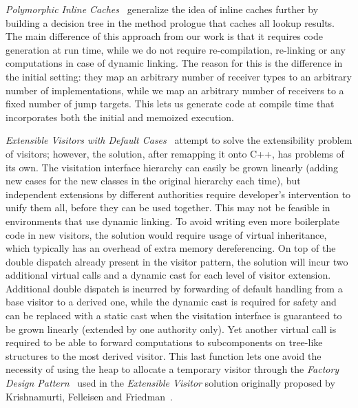 \emph{Polymorphic Inline Caches}~\cite{Holzle:Chambers:Ungar:91} generalize the 
idea of inline caches further by building a decision tree in the method prologue 
that caches all lookup results. The main difference of this approach from our 
work is that it requires code generation at run time, while we do not require
re-compilation, re-linking or any computations in case of dynamic linking.
The reason for this is the difference in the initial setting: they map an
arbitrary number of receiver types to an arbitrary number of implementations, while 
we map an arbitrary number of receivers to a fixed number of jump 
targets. This lets us generate code at compile time that incorporates both the 
initial and memoized execution.

\emph{Extensible Visitors with Default Cases}~\cite[]{Zenger:2001} attempt to solve the extensibility problem of visitors; 
however, the solution, after 
remapping it onto C++, has problems of its own. The visitation interface 
hierarchy can easily be grown linearly (adding new cases for the new classes in 
the original hierarchy each time), but independent extensions by different  
authorities require developer's intervention to unify them all, before they can 
be used together. This may not be feasible in environments that use dynamic 
linking. To avoid writing even more boilerplate code in new visitors, the 
solution would require usage of virtual inheritance, which typically has 
an overhead of extra memory dereferencing. On top of the double dispatch already 
present in the visitor pattern, the solution will incur two additional virtual 
calls and a dynamic cast for each level of visitor extension. Additional double 
dispatch is incurred by forwarding of default handling from a base visitor to a 
derived one, while the dynamic cast is required for safety and can be replaced 
with a static cast when the visitation interface is guaranteed to be grown linearly 
(extended by one authority only). Yet another virtual call is required to be 
able to forward computations to subcomponents on tree-like structures to the 
most derived visitor. This last function lets one avoid the necessity of using 
the heap to allocate a temporary visitor through the \emph{Factory Design 
Pattern}~\cite{DesignPatterns1993} used in the \emph{Extensible Visitor} solution 
originally proposed by Krishnamurti, Felleisen and Friedman~\cite{Krishnamurthi98}.

